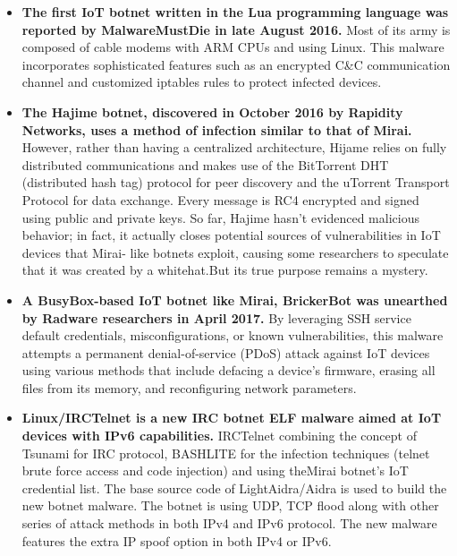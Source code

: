 \documentclass[conference]{IEEEtran}
\begin{document}
\begin{itemize}
\item{
\textbf{The first IoT botnet written in the
Lua programming language was reported
by MalwareMustDie in late August
2016.} Most of its army is composed
of cable modems with ARM CPUs
and using Linux. This malware incorporates
sophisticated features such
as an encrypted C&C communication
channel and customized iptables rules
to protect infected devices.\cite{b8}}

\item{
\textbf{The Hajime botnet, discovered in
October 2016 by Rapidity Networks,
uses a method of infection similar to
that of Mirai.\cite{b6}} However, rather than having a centralized architecture, Hijame
relies on fully distributed communications
and makes use of the
BitTorrent DHT (distributed hash tag)
protocol for peer discovery and the
uTorrent Transport Protocol for data
exchange. Every message is RC4 encrypted
and signed using public and
private keys. So far, Hajime hasn’t evidenced
malicious behavior; in fact,
it actually closes potential sources
of vulnerabilities in IoT devices that
Mirai- like botnets exploit, causing
some researchers to speculate that it
was created by a whitehat.But its
true purpose remains a mystery.}

\item{
\textbf{A BusyBox-based IoT botnet like
Mirai, BrickerBot was unearthed by
Radware researchers in April 2017.}
By leveraging SSH service default credentials,
misconfigurations, or known
vulnerabilities, this malware attempts
a permanent denial-of-service (PDoS)
attack against IoT devices using various
methods that include defacing
a device’s firmware, erasing all files
from its memory, and reconfiguring
network parameters.}

\item{
\textbf{
Linux/IRCTelnet is a new IRC botnet ELF malware aimed
at IoT devices with IPv6 capabilities. } IRCTelnet combining
the concept of Tsunami for IRC protocol, BASHLITE
for the infection techniques (telnet brute force access and
code injection) and using theMirai botnet’s IoT credential
list. The base source code of LightAidra/Aidra is used to
build the new botnet malware. The botnet is using UDP,
TCP flood along with other series of attack methods in
both IPv4 and IPv6 protocol. The new malware features
the extra IP spoof option in both IPv4 or IPv6.\cite{b2}}



\end{itemize}
\end{document}
